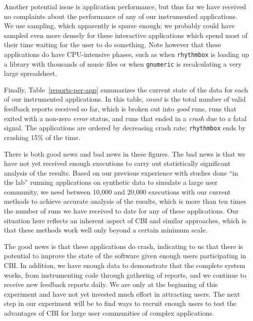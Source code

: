 \documentclass[times,10pt,twocolumn]{article}
\begin{document}
Another potential issue is application performance, but thus far we
have received no complaints about the performance of any of our
instrumented applications.  We use  sampling, which
apparently is sparse enough; we probably could have sampled even more
densely for these interactive applications which spend most of their
time waiting for the user to do something.  Note however that 
these applications do have CPU-intensive phases, such as when
{\tt rhythmbox} is loading up a library with thousands of music files or
when {\tt gnumeric} is recalculating a very large spreadsheet.

Finally, Table~\ref{reports-per-app} summarizes the current state of
the data for each of our instrumented applications.  In this table,
{\em count} is the total number of valid feedback reports received so far,
which is broken out into {\em good} runs, runs that exited with a
non-zero {\em error} status, and runs that ended in a {\em crash} due to a
fatal signal.  The applications are ordered by decreasing crash rate;
{\tt rhythmbox} ends by crashing 15\% of the time.

There is both good news and bad news in these figures.  The bad news
is that we have not yet received enough executions to carry out
statistically significant analysis of the results.  Based on our
previous experience with studies done ``in the lab'' running
applications on synthetic data to simulate a large user community, we
need between 10,000 and 20,000 executions with our current methods to
achieve accurate analysis of the results, which is more than ten times
the number of runs we have received to date for any of these
applications.  Our situation here reflects an inherent aspect of CBI
and similar approaches, which is that these methods work well only
beyond a certain minimum scale.

The good news is that these applications do crash,
indicating to us that there is potential to improve the state
of the software given enough users participating in CBI.  In addition,
we have enough data to demonstrate that the complete system works, from
instrumenting code through gathering of reports, and we continue to
receive new feedback reports daily.  We are only at the beginning of this
experiment and have not yet invested much effort in attracting users. 
The next step in our experiment will be
to find ways to recruit enough users to test the advantages of CBI
for large user communities of complex applications.
\end{document}
